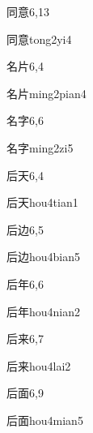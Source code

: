\begin{entry}{同意}{6,13}
  \begin{phonetics}{同意}{tong2yi4}
  \end{phonetics}
\end{entry}

\begin{entry}{名片}{6,4}
  \begin{phonetics}{名片}{ming2pian4}
  \end{phonetics}
\end{entry}

\begin{entry}{名字}{6,6}
  \begin{phonetics}{名字}{ming2zi5}
  \end{phonetics}
\end{entry}

\begin{entry}{后天}{6,4}
  \begin{phonetics}{后天}{hou4tian1}
  \end{phonetics}
\end{entry}

\begin{entry}{后边}{6,5}
  \begin{phonetics}{后边}{hou4bian5}
  \end{phonetics}
\end{entry}

\begin{entry}{后年}{6,6}
  \begin{phonetics}{后年}{hou4nian2}
  \end{phonetics}
\end{entry}

\begin{entry}{后来}{6,7}
  \begin{phonetics}{后来}{hou4lai2}
  \end{phonetics}
\end{entry}

\begin{entry}{后面}{6,9}
  \begin{phonetics}{后面}{hou4mian5}
  \end{phonetics}
\end{entry}

